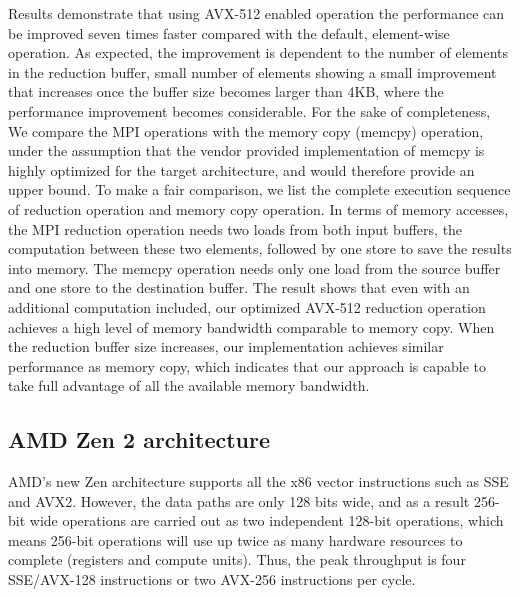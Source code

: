 \documentclass[5p,times,twocolumn]{elsarticle}
\newcommand{\mpi}[0]{\textsc{MPI}\xspace}
\begin{document}
Results demonstrate that using AVX-512 enabled operation the
performance can be improved seven times faster compared with the
default, element-wise operation. As expected, the improvement is dependent to the
number of elements in the reduction buffer, small number of elements showing a small improvement
that increases once the buffer size becomes larger than 4KB, where the performance improvement
becomes considerable.
%
For the sake of completeness, We compare the MPI
operations with the memory copy (memcpy) operation, under the assumption that
the vendor provided implementation of memcpy is highly optimized for the
target architecture, and would therefore provide an upper bound. To make a fair comparison, we list the
complete execution sequence of reduction operation and memory copy
operation.  In terms of memory accesses, the \mpi reduction operation needs
two loads from both input buffers, the
computation between these two elements, followed by one store to save the results into
memory. The memcpy operation needs only one load from the source buffer and one store to
the destination buffer. The result shows that even with an additional
computation included, our optimized AVX-512 reduction operation
achieves a high level of memory bandwidth comparable to
memory copy. When the reduction buffer size increases,
our implementation achieves similar performance as
memory copy, which indicates that our approach is capable to take full advantage of all the available memory bandwidth.

\subsection{AMD Zen 2 architecture}
AMD's new Zen architecture supports all the x86 vector instructions such as SSE and AVX2.
However, the data paths are only 128 bits wide, and as a result 256-bit wide operations are carried
out as two independent 128-bit operations, which means 256-bit operations will
use up twice as many hardware resources to complete (registers and compute units). Thus, the peak throughput is four SSE/AVX-128 instructions or two AVX-256 instructions per cycle.
\end{document}
